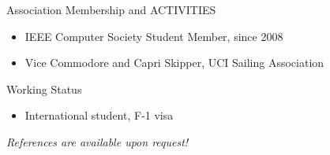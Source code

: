\documentclass{resume} %
\begin{document}
\begin{comment}
}
\end{rSection}
\end{comment}

\begin{rSection}{Association Membership and ACTIVITIES}
{\small
\begin{itemize}
\item IEEE Computer Society Student Member, since 2008
\vspace{-0.5em}
\item Vice Commodore and Capri Skipper, UCI Sailing Association
\end{itemize}
}
\end{rSection}

\vspace{-0.5em}
\begin{rSection}{Working Status}
\begin{itemize}
\item International student, F-1 visa
\end{itemize}
\end{rSection}


\centerline{
\textit{References are available upon request!}
}




\end{document}
